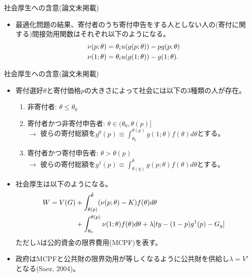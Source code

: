 \documentclass[dvipdfmx,10pt]{beamer}
\begin{document}
\begin{frame}{社会厚生への含意(論文未掲載)}
	\begin{itemize}
	\item 最適化問題の結果、寄付者のうち寄付申告をする人としない人の(寄付に関する)間接効用関数はそれぞれ以下のようになる。
	\begin{align}
		\nu(p;\theta)&=\theta_i u(g(p;\theta))-pg(p;\theta)\notag\\
		\nu(1;\theta)&=\theta_i u(g(1;\theta))-g(1;\theta)\notag.
	\end{align}
\end{itemize}
\end{frame}

\begin{frame}{社会厚生への含意(論文未掲載)}
	\begin{itemize}
		\item 寄付選好$\theta$と寄付価格$p$の大きさによって社会には以下の3種類の人が存在。
		\begin{enumerate}
			\item 非寄付者: $\theta\le \theta_0$
			\item 寄付者かつ非寄付申告者: $\theta\in(\theta_0,\theta(p)]$\\
			$\to$ 彼らの寄付総額を$g^0(p)\equiv\int_{\theta_0}^{\theta(p)}g(1;\theta)f(\theta)d\theta$とする。
			\item 寄付者かつ寄付申告者: $\theta>\theta(p)$\\
			$\to$ 彼らの寄付総額を$g^1(p)\equiv\int_{\theta(q)}^{\bar{\theta}}g(p;\theta)f(\theta)d\theta$とする。
		\end{enumerate}
	\item 社会厚生は以下のようになる。
	\begin{align}
		W=V(G)&+\int_{\theta(p)}^{\bar{\theta}}(\nu(p;\theta)-K)f(\theta)d\theta\notag\\
		&+\int_{\theta_0}^{\theta(p)}\nu(1;\theta)f(\theta)d\theta+\lambda[ty-(1-p)g^1(p)-G_g]\notag
	\end{align}
	ただし$\lambda$は公的資金の限界費用(MCPF)を表す。
	\item 政府はMCPFと公共財の限界効用が等しくなるように公共財を供給し$\lambda=V'$となる(Saez, 2004)。
	\end{itemize}
\end{frame}
\end{document}
